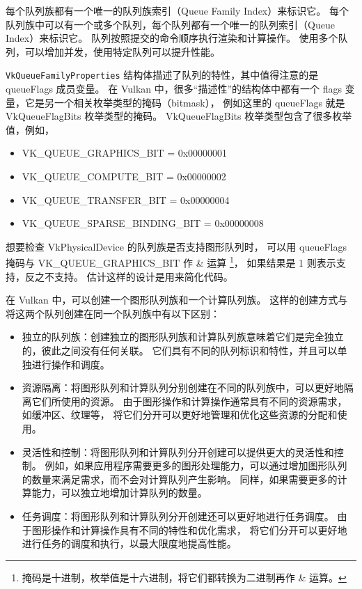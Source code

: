 \documentclass[a4paper, 12pt]{ctexart}
\begin{document}
    每个队列族都有一个唯一的队列族索引（Queue Family Index）来标识它。
    每个队列族中可以有一个或多个队列，每个队列都有一个唯一的队列索引（Queue Index）来标识它。
    队列按照提交的命令顺序执行渲染和计算操作。
    使用多个队列，可以增加并发，使用特定队列可以提升性能。

    \texttt{VkQueueFamilyProperties} 结构体描述了队列的特性，其中值得注意的是 queueFlags 成员变量。
    在 Vulkan 中，很多“描述性”的结构体中都有一个 flags 变量，它是另一个相关枚举类型的掩码（bitmask），
    例如这里的 queueFlags 就是 VkQueueFlagBits 枚举类型的掩码。
    VkQueueFlagBits 枚举类型包含了很多枚举值，例如，
    
    \begin{itemize}[itemindent=1em, itemsep=0pt, topsep=0pt, parsep=0pt]
        \item VK\_QUEUE\_GRAPHICS\_BIT = 0x00000001
        \item VK\_QUEUE\_COMPUTE\_BIT = 0x00000002
        \item VK\_QUEUE\_TRANSFER\_BIT = 0x00000004
        \item VK\_QUEUE\_SPARSE\_BINDING\_BIT = 0x00000008
    \end{itemize}

    想要检查 VkPhysicalDevice 的队列族是否支持图形队列时，
    可以用 queueFlags 掩码与 VK\_QUEUE\_GRAPHICS\_BIT 作 \& 运算
    \footnote{
        掩码是十进制，枚举值是十六进制，将它们都转换为二进制再作 \& 运算。
    }，
    如果结果是 1 则表示支持，反之不支持。
    估计这样的设计是用来简化代码。

    在 Vulkan 中，可以创建一个图形队列族和一个计算队列族。
    这样的创建方式与将这两个队列创建在同一个队列族中有以下区别：

    \begin{itemize}[itemindent=1em, itemsep=0pt, topsep=0pt, parsep=0pt]
        \item 独立的队列族：创建独立的图形队列族和计算队列族意味着它们是完全独立的，彼此之间没有任何关联。
                它们具有不同的队列标识和特性，并且可以单独进行操作和调度。
        \item 资源隔离：将图形队列和计算队列分别创建在不同的队列族中，可以更好地隔离它们所使用的资源。
                由于图形操作和计算操作通常具有不同的资源需求，如缓冲区、纹理等，
                将它们分开可以更好地管理和优化这些资源的分配和使用。
        \item 灵活性和控制：将图形队列和计算队列分开创建可以提供更大的灵活性和控制。
                例如，如果应用程序需要更多的图形处理能力，可以通过增加图形队列的数量来满足需求，而不会对计算队列产生影响。
                同样，如果需要更多的计算能力，可以独立地增加计算队列的数量。
        \item 任务调度：将图形队列和计算队列分开创建还可以更好地进行任务调度。
                由于图形操作和计算操作具有不同的特性和优化需求，
                将它们分开可以更好地进行任务的调度和执行，以最大限度地提高性能。
    \end{itemize}
\end{document}
